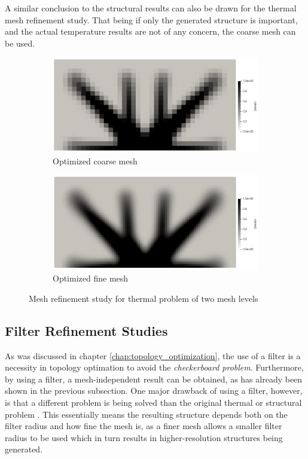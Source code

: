 A similar conclusion to the structural results can also be drawn for the thermal mesh refinement study. That being if only the generated structure is important, and the actual temperature results are not of any concern, the coarse mesh can be used.
\begin{figure}[ht]
  \centering
  \hfill
  \begin{subfigure}[b]{0.4\linewidth}
      \includegraphics[width=\linewidth]{figures/chapter_4/MeshRefinementCoarseThermal.png}
      \caption{Optimized coarse mesh}
  \end{subfigure}
  \hfill
  \begin{subfigure}[b]{0.4\linewidth}
      \includegraphics[width=\linewidth]{figures/chapter_4/MeshRefinementFineThermal.png}
      \caption{Optimized fine mesh}
  \end{subfigure}
  \hfill
  \caption{Mesh refinement study for thermal problem of two mesh levels}
  \label{fig:mesh_refinement_thermal}
\end{figure}


\subsection*{Filter Refinement Studies}
As was discussed in chapter \ref{chap:topology_optimization}, the use of a filter is a necessity in topology optimation to avoid the \emph{checkerboard problem}. Furthermore, by using a filter, a mesh-independent result can be obtained, as has already been shown in the previous subsection. One major drawback of using a filter, however, is that a different problem is being solved than the original thermal or structural problem \cite{Bendsøe_2004}. This essentially means the resulting structure depends both on the filter radius and how fine the mesh is, as a finer mesh allows a smaller filter radius to be used which in turn results in higher-resolution structures being generated.

